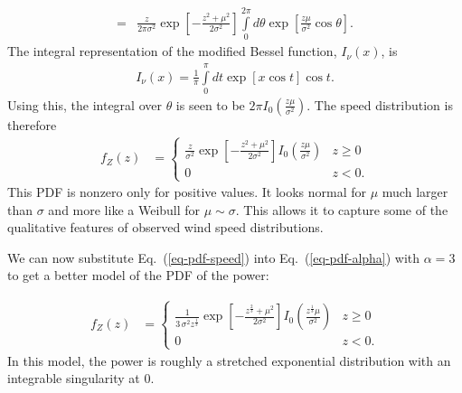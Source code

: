\documentclass[11pt]{article}
\begin{document}
\begin{multicols}{2}
\begin{align*}
 = & \frac{z}{2 \pi \sigma^2} \exp \left[ -\frac{z^2 + \mu^2}{2 \sigma^2}\right]  \int \limits_{0}^{2 \pi} d \theta \exp\left[ \frac{z \mu}{\sigma^2} \cos \theta \right].
 \end{align*}
 The  integral representation of the modified Bessel function, $I_\nu(x)$, is
 \begin{align*}
 I_\nu(x) =\frac{1}{\pi}  \int \limits_{0}^{\pi} d t \exp\left[x \cos t \right] \cos t.
 \end{align*}
 Using this, the integral over $\theta$ is seen to be $2 \pi I_0\left( \frac{z \mu}{\sigma^2}\right)$.
 The speed distribution is therefore
 \begin{align}
 \label{eq-pdf-speed}
 f_Z(z) &= \left\{ 
 \begin{array}{ll}
 \frac{z}{\sigma^2}  \exp \left[ -\frac{z^2 + \mu^2}{2 \sigma^2}\right]  I_0\left( \frac{z \mu}{\sigma^2}\right)
   & z \geq 0\\
0 & z < 0.
\end{array}
\right.
\end{align}
This PDF is nonzero only for positive values. It looks normal for $\mu$ much larger than $\sigma$ and more like a Weibull for $\mu \sim \sigma$.
This allows it to capture some of the qualitative features of observed wind speed distributions.

We can now substitute Eq.~(\ref{eq-pdf-speed}) into Eq.~(\ref{eq-pdf-alpha}) with $\alpha=3$ to get a better model of the PDF of the power:

\begin{align*}
 \label{eq-pdf-power}
 f_Z(z) &= \left\{ 
 \begin{array}{ll}
 \frac{1}{3\, \sigma^2 z^\frac{1}{3}}  \exp \left[ -\frac{z^\frac{2}{3} + \mu^2}{2 \sigma^2}\right]  I_0\left( \frac{z^\frac{1}{3} \mu}{\sigma^2}\right)
   & z \geq 0\\
0 & z < 0.
\end{array}
\right.
\end{align*}
In this model, the power is roughly a stretched exponential distribution with an integrable singularity at $0$.



\end{multicols}
\end{document}
